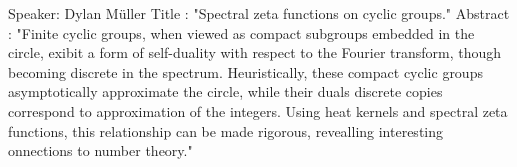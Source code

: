 Speaker: Dylan Müller
Title : "Spectral zeta functions on cyclic groups."
Abstract : "Finite cyclic groups, when viewed as compact subgroups embedded in the circle, exibit a form of self-duality with respect to the Fourier transform, though becoming discrete in the spectrum. Heuristically, these compact cyclic groups asymptotically approximate the circle, while their duals discrete copies correspond to approximation of the integers. Using heat kernels and spectral zeta functions, this relationship can be made rigorous, revealling interesting onnections to number theory."


